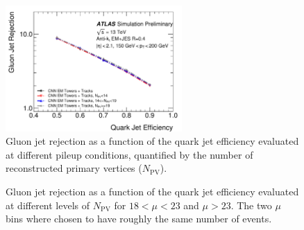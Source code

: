 \begin{figure}[htpb]
\begin{center}
\includegraphics[width=0.6\textwidth]{figures/CNN/ROC_pt150_200_NPV.pdf}
\caption{Gluon jet rejection as a function of the quark jet efficiency %
evaluated at different pileup conditions, 
quantified by the number of reconstructed primary vertices ($N_\text{PV}$).}
\label{fig:cnn-pileup}
\end{center}
\end{figure}


\begin{figure}[htpb]
\begin{center}
\caption{Gluon jet rejection as a function of the quark jet efficiency 
evaluated at different levels of $N_\text{PV}$ for \protect{} $18<\mu<23$ and \protect{}  $\mu > 23$.
The two $\mu$ bins where chosen to have roughly the same number of events.}
\label{fig:cnn-pileup2}
\end{center}
\end{figure}


